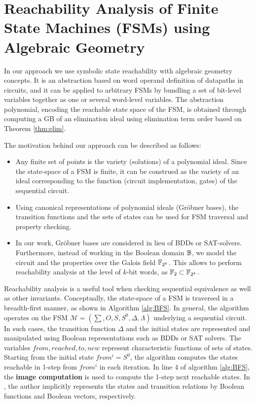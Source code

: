 \section{Reachability Analysis of Finite State Machines (FSMs) using Algebraic Geometry}
In our approach we use symbolic state reachability with algebraic
geometry concepts. It is an abstraction based on word operand
definition of datapaths in circuits, and it can be applied
to arbitrary FSMs by bundling a set of bit-level variables together as
one or several word-level variables.  The abstraction polynomial,
encoding the reachable state space of the FSM, is obtained through
computing a GB of an elimination ideal using elimination term order
based on Theorem \ref{thm:elim}.  

The motivation behind our approach can be described as follows:
\begin{itemize}
\item Any finite set of points is the variety (solutions) of a
  polynomial ideal. Since the state-space of a FSM is finite, it can
  be construed as the variety of an ideal corresponding to the
  function (circuit implementation, gates) of the   sequential circuit.
\item Using canonical representations of polynomial ideals (Gr\"obner
  bases), the transition functions and the sets of states can be used
  for FSM traversal and property checking. 
\item In our work, Gr\"obner bases are considered in lieu of BDDs or
  SAT-solvers. Furthermore, instead of working in the Boolean domain
  ${\mathbb{B}}$, we model the circuit and the properties over the Galois field
  ${\mathbb{F}}_{2^k}$. This allows to perform reachability analysis at the level of
  $k$-bit words, as $\mathbb{F}_2 \subset {\mathbb{F}}_{2^k}$.

\end{itemize}

Reachability analysis is a useful tool when checking sequential
equivalence as well as other invariants. 
Conceptually, the state-space of a FSM is traversed in a breadth-first
manner, as shown in Algorithm \ref{alg:BFS}. %
In general, the algorithm operates on the FSM 
$\mathcal{M} = (\sum, O, S, S^0, \Delta, \Lambda)$ underlying a
sequential circuit. In such cases, the transition function $\Delta$
and the initial states are represented and manipulated using Boolean
representations such as BDDs or SAT solvers. The variables $from,
reached, to, new$ represent characteristic functions of sets of
states. Starting from the initial state $from^i = S^0$, the algorithm
computes the states reachable in 1-step from $from^i$ in each iteration.
In line 4 of algorithm \ref{alg:BFS}, the {\bf image computation} is
used to compute the 1-step next reachable states. In
\cite{KallaPartialScan}, the author implicitly represents the states
and transition relations by Boolean functions and Boolean vectors,
respectively. 



